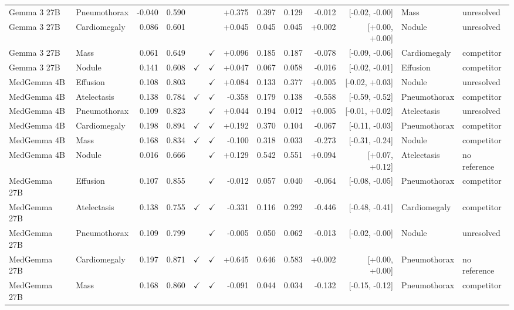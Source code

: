 \begin{longtable}{llrrccrrrrrll}
Gemma 3 27B & Pneumothorax & -0.040 & 0.590 &  &  & +0.375 & 0.397 & 0.129 & -0.012 & [-0.02, -0.00] & Mass & unresolved \\
Gemma 3 27B & Cardiomegaly & 0.086 & 0.601 &  &  & +0.045 & 0.045 & 0.045 & +0.002 & [+0.00, +0.00] & Nodule & unresolved \\
Gemma 3 27B & Mass & 0.061 & 0.649 &  & $\checkmark$ & +0.096 & 0.185 & 0.187 & -0.078 & [-0.09, -0.06] & Cardiomegaly & competitor \\
Gemma 3 27B & Nodule & 0.141 & 0.608 & $\checkmark$ & $\checkmark$ & +0.047 & 0.067 & 0.058 & -0.016 & [-0.02, -0.01] & Effusion & competitor \\
MedGemma 4B & Effusion & 0.108 & 0.803 &  & $\checkmark$ & +0.084 & 0.133 & 0.377 & +0.005 & [-0.02, +0.03] & Nodule & unresolved \\
MedGemma 4B & Atelectasis & 0.138 & 0.784 & $\checkmark$ & $\checkmark$ & -0.358 & 0.179 & 0.138 & -0.558 & [-0.59, -0.52] & Pneumothorax & competitor \\
MedGemma 4B & Pneumothorax & 0.109 & 0.823 &  & $\checkmark$ & +0.044 & 0.194 & 0.012 & +0.005 & [-0.01, +0.02] & Atelectasis & unresolved \\
MedGemma 4B & Cardiomegaly & 0.198 & 0.894 & $\checkmark$ & $\checkmark$ & +0.192 & 0.370 & 0.104 & -0.067 & [-0.11, -0.03] & Pneumothorax & competitor \\
MedGemma 4B & Mass & 0.168 & 0.834 & $\checkmark$ & $\checkmark$ & -0.100 & 0.318 & 0.033 & -0.273 & [-0.31, -0.24] & Nodule & competitor \\
MedGemma 4B & Nodule & 0.016 & 0.666 &  & $\checkmark$ & +0.129 & 0.542 & 0.551 & +0.094 & [+0.07, +0.12] & Atelectasis & no reference \\
MedGemma 27B & Effusion & 0.107 & 0.855 &  & $\checkmark$ & -0.012 & 0.057 & 0.040 & -0.064 & [-0.08, -0.05] & Pneumothorax & competitor \\
MedGemma 27B & Atelectasis & 0.138 & 0.755 & $\checkmark$ & $\checkmark$ & -0.331 & 0.116 & 0.292 & -0.446 & [-0.48, -0.41] & Cardiomegaly & competitor \\
MedGemma 27B & Pneumothorax & 0.109 & 0.799 &  & $\checkmark$ & -0.005 & 0.050 & 0.062 & -0.013 & [-0.02, -0.00] & Nodule & unresolved \\
MedGemma 27B & Cardiomegaly & 0.197 & 0.871 & $\checkmark$ & $\checkmark$ & +0.645 & 0.646 & 0.583 & +0.002 & [+0.00, +0.00] & Pneumothorax & no reference \\
MedGemma 27B & Mass & 0.168 & 0.860 & $\checkmark$ & $\checkmark$ & -0.091 & 0.044 & 0.034 & -0.132 & [-0.15, -0.12] & Pneumothorax & competitor \\

\end{longtable}

